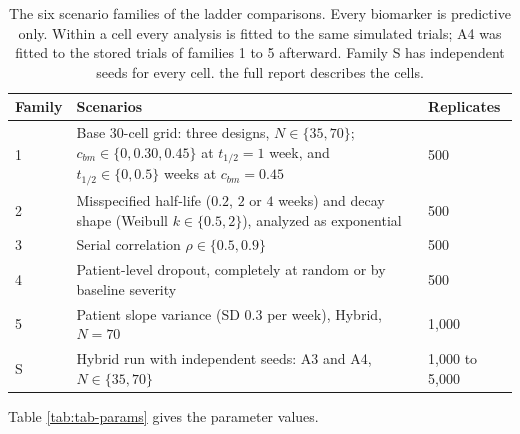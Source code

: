 \documentclass[
  11pt,
]{article}
\begin{document}
\begin{table}
\centering
\caption{\label{tab:tab-families}The six scenario families of the ladder comparisons.
    Every biomarker is predictive only. Within a cell every analysis
    is fitted to the same simulated trials; A4 was fitted to the
    stored trials of families 1 to 5 afterward. Family S has
    independent seeds for every cell. the full report
    describes the cells.}
\centering
\fontsize{9}{11}\selectfont
\begin{tabular}[t]{l>{\raggedright\arraybackslash}p{9.5cm}l}
\toprule
Family & Scenarios & Replicates\\
\midrule
1 & Base 30-cell grid: three designs, $N \in \{35, 70\}$; $c_{bm} \in \{0, 0.30, 0.45\}$ at $t_{1/2} = 1$ week, and $t_{1/2} \in \{0, 0.5\}$ weeks at $c_{bm} = 0.45$ & 500\\
2 & Misspecified half-life ($0.2$, $2$ or $4$ weeks) and decay shape (Weibull $k \in \{0.5, 2\}$), analyzed as exponential & 500\\
3 & Serial correlation $\rho \in \{0.5, 0.9\}$ & 500\\
4 & Patient-level dropout, completely at random or by baseline severity & 500\\
5 & Patient slope variance (SD 0.3 per week), Hybrid, $N = 70$ & 1,000\\
S & Hybrid run with independent seeds: A3 and A4, $N \in \{35, 70\}$ & 1,000 to 5,000\\
\bottomrule
\end{tabular}
\end{table}

Table \ref{tab:tab-params} gives the parameter values.
\end{document}
